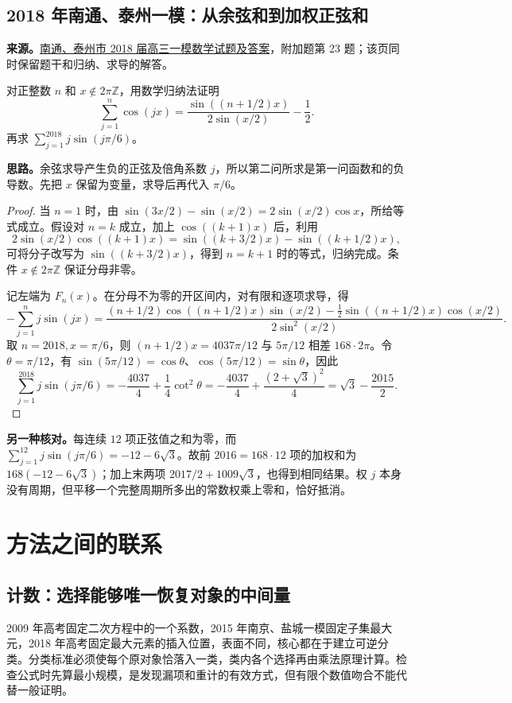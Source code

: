 \documentclass[UTF8]{ctexart}
\begin{document}
\subsection{2018 年南通、泰州一模：从余弦和到加权正弦和}\label{sec:c2018nttz1}
\textbf{来源。}\href{https://yn.qinxue100.com/news/gz/20180306/59373.html}{南通、泰州市 2018 届高三一模数学试题及答案}，附加题第 23 题；该页同时保留题干和归纳、求导的解答。
\begin{example}[题意]
对正整数 $n$ 和 $x\notin2\pi\mathbb Z$，用数学归纳法证明
\[
\sum_{j=1}^{n}\cos(jx)=\frac{\sin((n+1/2)x)}{2\sin(x/2)}-\frac12.
\]
再求 $\sum_{j=1}^{2018}j\sin(j\pi/6)$。
\end{example}
\textbf{思路。}余弦求导产生负的正弦及倍角系数 $j$，所以第二问所求是第一问函数和的负导数。先把 $x$ 保留为变量，求导后再代入 $\pi/6$。
\begin{proof}
当 $n=1$ 时，由 $\sin(3x/2)-\sin(x/2)=2\sin(x/2)\cos x$，所给等式成立。假设对 $n=k$ 成立，加上 $\cos((k+1)x)$ 后，利用
\[
2\sin(x/2)\cos((k+1)x)
=\sin((k+3/2)x)-\sin((k+1/2)x),
\]
可将分子改写为 $\sin((k+3/2)x)$，得到 $n=k+1$ 时的等式，归纳完成。条件 $x\notin2\pi\mathbb Z$ 保证分母非零。

记左端为 $F_n(x)$。在分母不为零的开区间内，对有限和逐项求导，得
\[
-\sum_{j=1}^{n}j\sin(jx)
=\frac{(n+1/2)\cos((n+1/2)x)\sin(x/2)
-\tfrac12\sin((n+1/2)x)\cos(x/2)}{2\sin^2(x/2)}.
\]
取 $n=2018,x=\pi/6$，则 $(n+1/2)x=4037\pi/12$ 与 $5\pi/12$ 相差 $168\cdot2\pi$。令 $\theta=\pi/12$，有 $\sin(5\pi/12)=\cos\theta$、$\cos(5\pi/12)=\sin\theta$，因此
\[
\sum_{j=1}^{2018}j\sin(j\pi/6)
=-\frac{4037}{4}+\frac14\cot^2\theta
=-\frac{4037}{4}+\frac{(2+\sqrt3)^2}{4}
=\boxed{\sqrt3-\frac{2015}{2}}.
\]
\end{proof}
\textbf{另一种核对。}每连续 $12$ 项正弦值之和为零，而 $\sum_{j=1}^{12}j\sin(j\pi/6)=-12-6\sqrt3$。故前 $2016=168\cdot12$ 项的加权和为 $168(-12-6\sqrt3)$；加上末两项 $2017/2+1009\sqrt3$，也得到相同结果。权 $j$ 本身没有周期，但平移一个完整周期所多出的常数权乘上零和，恰好抵消。

\section{方法之间的联系}\label{sec:methods}
\subsection{计数：选择能够唯一恢复对象的中间量}
2009 年高考固定二次方程中的一个系数，2015 年南京、盐城一模固定子集最大元，2018 年高考固定最大元素的插入位置，表面不同，核心都在于建立可逆分类。分类标准必须使每个原对象恰落入一类，类内各个选择再由乘法原理计算。检查公式时先算最小规模，是发现漏项和重计的有效方式，但有限个数值吻合不能代替一般证明。
\end{document}
